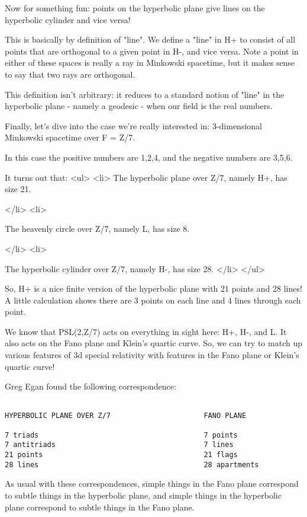 Now for something fun: points on the hyperbolic plane give lines on the 
hyperbolic cylinder and vice versa!  

This is basically by definition of "line".  We define a "line" in H+ to consist 
of all points that are orthogonal to a given point in H-, and vice versa.
Note a point in either of these spaces is really a ray in Minkowski spacetime, 
but it makes sense to say that two rays are orthogonal.  


This definition isn't arbitrary: it reduces to a standard notion of "line" in
the hyperbolic plane - namely a geodesic - when our field is the real numbers.


Finally, let's dive into the case we're really interested in: 
3-dimensional Minkowski spacetime over F = Z/7.


In this case the positive numbers are 1,2,4, and the negative numbers
are 3,5,6.  

It turns out that:
<ul>
<li>
 The hyperbolic plane over Z/7, namely H+, has size 21.  

</li>
<li>

 The heavenly circle over Z/7, namely L, has size 8.

</li>
<li>

 The hyperbolic cylinder over Z/7, namely H-, has size 28.   
</li>
</ul>

So, H+ is a nice finite version of the hyperbolic plane with 21 points and 
28 lines!  A little calculation shows there are 3 points on each line and 
4 lines through each point.

We know that PSL(2,Z/7) acts on everything in sight here: H+, H-, and L.  
It also acts on the Fano plane and Klein's quartic curve.  So, we can try to 
match up various features of 3d special relativity with features in the Fano 
plane or Klein's quartic curve!

Greg Egan found the following correspondence:

\begin{verbatim}

HYPERBOLIC PLANE OVER Z/7                      FANO PLANE    

7 triads                                       7 points  
7 antitriads                                   7 lines       
21 points                                      21 flags     
28 lines                                       28 apartments 
\end{verbatim}
    
As usual with these correspondences, simple things in the Fano plane correspond 
to subtle things in the hyperbolic plane, and simple things in the hyperbolic 
plane correspond to subtle things in the Fano plane.


